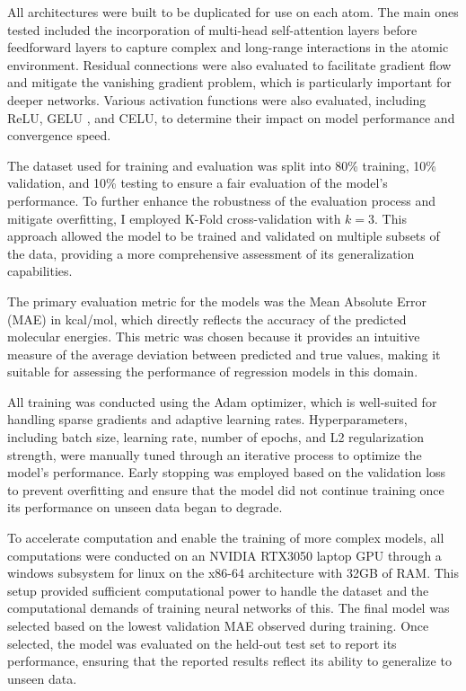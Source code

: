\documentclass[11pt, twocolumn]{article}
\begin{document}
All architectures were built to be duplicated for use on each atom. The main ones tested included the incorporation of multi-head self-attention layers \cite{vaswani2017attention} before feedforward layers to capture complex and long-range interactions in the atomic environment. Residual connections were also evaluated to facilitate gradient flow and mitigate the vanishing gradient problem, which is particularly important for deeper networks. Various activation functions were also evaluated, including ReLU, GELU \cite{hendrycks2016gaussian}, and CELU, to determine their impact on model performance and convergence speed.

The dataset used for training and evaluation was split into 80\% training, 10\% validation, and 10\% testing to ensure a fair evaluation of the model's performance. To further enhance the robustness of the evaluation process and mitigate overfitting, I employed K-Fold cross-validation with $k=3$. This approach allowed the model to be trained and validated on multiple subsets of the data, providing a more comprehensive assessment of its generalization capabilities.

 The primary evaluation metric for the models was the Mean Absolute Error (MAE) in kcal/mol, which directly reflects the accuracy of the predicted molecular energies. This metric was chosen because it provides an intuitive measure of the average deviation between predicted and true values, making it suitable for assessing the performance of regression models in this domain.

All training was conducted using the Adam optimizer, which is well-suited for handling sparse gradients and adaptive learning rates. Hyperparameters, including batch size, learning rate, number of epochs, and L2 regularization strength, were manually tuned through an iterative process to optimize the model's performance. Early stopping was employed based on the validation loss to prevent overfitting and ensure that the model did not continue training once its performance on unseen data began to degrade.

To accelerate computation and enable the training of more complex models, all computations were conducted on an NVIDIA RTX3050 laptop GPU through a windows subsystem for linux on the x86-64 architecture with 32GB of RAM. This setup provided sufficient computational power to handle the dataset and the computational demands of training neural networks of this. The final model was selected based on the lowest validation MAE observed during training. Once selected, the model was evaluated on the held-out test set to report its performance, ensuring that the reported results reflect its ability to generalize to unseen data.
\end{document}
